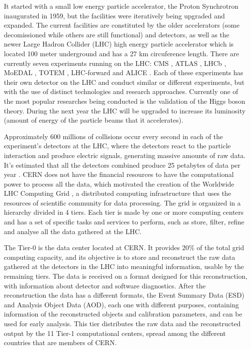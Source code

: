 It started with a small low energy particle accelerator, the Proton Synchrotron \cite{CERN:PS} inaugurated in 1959, but the facilities were iteratively being upgraded and expanded. The current facilities are constituted by the older accelerators (some decomissioned while others are still functional) and detectors, as well as the newer Large Hadron Collider (LHC) \cite{CERN:LHC} high energy particle accelerator which is located 100 meter underground and has a 27 km circuference length. There are currently seven experiments running on the LHC: CMS \cite{CERN:CMS}, ATLAS \cite{CERN:ATLAS}, LHCb \cite{CERN:LHCb}, MoEDAL \cite{CERN:MoEDAL}, TOTEM \cite{CERN:TOTEM}, LHC-forward \cite{CERN:LHCf} and ALICE \cite{CERN:ALICE}. Each of these experiments has their own detector on the LHC and conduct similar or different experiments, but with the use of distinct technologies and research approaches. Currently one of the most popular researches being conducted is the validation of the Higgs boson theory. During the next year the LHC will be upgraded to increase its luminosity (amount of energy of the particle beams that it accelerates).

Approximately 600 millions of collisions occur every second in each of the experiment's detectors at the LHC, where the detectors react to the particle interaction and produce electric signals, generating massive amounts of raw data. It's estimated that all the detectors combined produce 25 petabytes of data per year \cite{CERN:DATA1,CERN:DATA2}. CERN does not have the financial resources to have the computational power to process all the data, which motivated the creation of the Worldwide LHC Computing Grid \cite{CERN:WLHCCG}, a distributed computing infrastructure that uses the resources of scientific community for data processing. The grid is organized in a hierarchy divided in 4 tiers. Each tier is made by one or more computing centers and has a set of specific tasks and services to perform, such as store, filter, refine and analyse all the data gathered at the LHC.

The Tier-0 is the data center located at CERN. It provides 20\% of the total grid computing capacity, and its objective is to store and reconstruct the raw data gathered at the detectors in the LHC into meaningful information, usable by the remaining tiers. The data is received on a format designed for this reconstruction, with information about detector and software diagnostics. After the reconstruction the data has a different formats, the Event Summary Data (ESD) and Analysis Object Data (AOD), each one with different purposes, containing information of the reconstructed objects and calibration parameters, and can be used for early analysis. This tier distributes the raw data and the reconstructed output by the 11 Tier-1 computational centers, spread among the different countries that are members of CERN.


